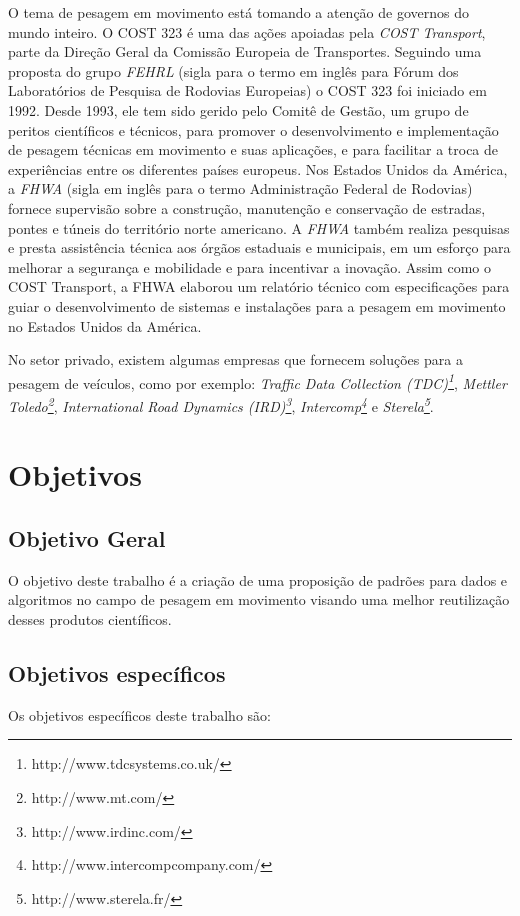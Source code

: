 \documentclass{ufscThesis}
\begin{document}
O tema de pesagem em movimento está tomando a atenção de governos do mundo inteiro. O COST 323 é uma das ações apoiadas pela \textit{COST Transport}, parte da Direção Geral da Comissão Europeia de Transportes. Seguindo uma proposta do grupo \textit{FEHRL} (sigla para o termo em inglês para Fórum dos Laboratórios de Pesquisa de Rodovias Europeias) o COST 323 foi iniciado em 1992. Desde 1993, ele tem sido gerido pelo Comitê de Gestão, um grupo de peritos científicos e técnicos, para promover o desenvolvimento e implementação de pesagem técnicas em movimento e suas aplicações, e para facilitar a troca de experiências entre os diferentes países europeus. Nos Estados Unidos da América, a \textit{FHWA} (sigla em inglês para o termo Administração Federal de Rodovias) fornece supervisão sobre a construção, manutenção e conservação de estradas, pontes e túneis do território norte americano. A \textit{FHWA} também realiza pesquisas e presta assistência técnica aos órgãos estaduais e municipais, em um esforço para melhorar a segurança e mobilidade e para incentivar a inovação. Assim como o COST Transport, a FHWA elaborou um relatório técnico \cite{tech:fhwa-wim-data-analysts-manual} com especificações para guiar o desenvolvimento de sistemas e instalações para a pesagem em movimento no Estados Unidos da América.

No setor privado, existem algumas empresas  que fornecem soluções para a pesagem de veículos, como por exemplo: \textit{Traffic Data Collection (TDC)\footnote{http://www.tdcsystems.co.uk/}}, \textit{Mettler Toledo\footnote{http://www.mt.com/}}, \textit{International Road Dynamics (IRD)\footnote{http://www.irdinc.com/}}, \textit{Intercomp\footnote{http://www.intercompcompany.com/}} e \textit{Sterela\footnote{http://www.sterela.fr/}}.


\section{Objetivos}\label{introducao-objetivos}
\subsection{Objetivo Geral}\label{introducao-objetivo-geral}
O objetivo deste trabalho é a criação de uma proposição de padrões para dados e algoritmos no campo de pesagem em movimento visando uma melhor reutilização desses produtos científicos.

\subsection{Objetivos específicos}\label{introducao-objetivos-especificos}
Os objetivos específicos deste trabalho são:
\end{document}

